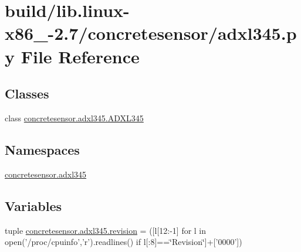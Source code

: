 \hypertarget{build_2lib_8linux-x86__64-2_87_2concretesensor_2adxl345_8py}{}\section{build/lib.linux-\/x86\+\_-\/2.7/concretesensor/adxl345.py File Reference}
\label{build_2lib_8linux-x86__64-2_87_2concretesensor_2adxl345_8py}
\subsection*{Classes}
\begin{DoxyCompactItemize}
\item 
class \hyperlink{classconcretesensor_1_1adxl345_1_1ADXL345}{concretesensor.\+adxl345.\+A\+D\+X\+L345}
\end{DoxyCompactItemize}
\subsection*{Namespaces}
\begin{DoxyCompactItemize}
\item 
 \hyperlink{namespaceconcretesensor_1_1adxl345}{concretesensor.\+adxl345}
\end{DoxyCompactItemize}
\subsection*{Variables}
\begin{DoxyCompactItemize}
\item 
tuple \hyperlink{namespaceconcretesensor_1_1adxl345_a02e8c4bf0550b3ac6e739c6c01493313}{concretesensor.\+adxl345.\+revision} = (\mbox{[}l\mbox{[}12\+:-\/1\mbox{]} for l in open('/proc/cpuinfo','r').readlines() if l\mbox{[}\+:8\mbox{]}==\char`\"{}Revision\char`\"{}\mbox{]}+\mbox{[}'0000'\mbox{]})
\end{DoxyCompactItemize}
